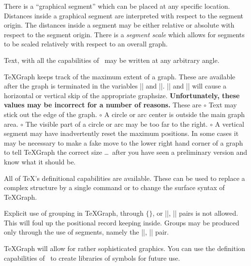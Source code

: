\lb There is  a ``graphical segment''  which can be
placed at any specific location. Distances inside a graphical segment are
interpreted with respect to the segment origin. The distances inside a
segment may be either relative or absolute with respect to the segment
origin. There is a {\it segment scale} which allows for segments to be scaled
relatively with respect to an overall graph. 

\lb Text, with all the capabilities of \intex\ may be written
at any arbitrary angle.

\lb \TeX Graph keeps track of the maximum extent of a graph. These
are available after the graph is terminated in the variables |\hgraphsize|
and |\vgraphsize|. |\hgraphskip| and |\vgraphskip| will cause a horizontal or
vertical skip of the appropriate graphsize. {\bf Unfortunately, these values
may be incorrect for a number of reasons. } These are
\bsl
\li $\circ$ Text may stick out the edge of the graph.
\li $\circ$ A circle or arc center is outside the main graph area.
\li $\circ$ The visible part of a circle or arc may be too far to the right.
\li $\circ$ A vertical segment may have inadvertently reset the maximum
positions.
\esl
In some cases it may be necessary to make a fake move to the lower right hand
corner of a graph to tell \TeX Graph the correct size \dots\ after you have
seen a preliminary version and know what it should be.

\lb All of \TeX's definitional capabilities are available. These
can be used to replace a complex structure by a single command or
to change the surface syntax of \TeX Graph. 

\lb Explicit use of grouping in \TeX Graph, through $\{ \}$, or
|\begingroup|, |\endgroup| pairs is not allowed. This will foul up the
positional record keeping inside. Groups may be produced only through the
use of segments, namely the |\beginsegment|, |\endsegment| pair. 
\el


\TeX Graph will allow for rather sophisticated graphics. You can use the 
definition capabilities of  \intex\ to create libraries of symbols 
for future use. 

